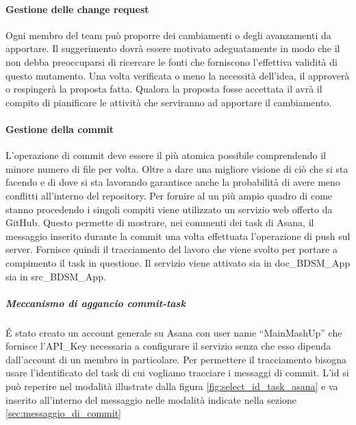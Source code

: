 			\paragraph{Gestione delle change request}
			Ogni membro del team può proporre dei cambiamenti o degli avanzamenti da apportare. Il suggerimento dovrà essere motivato adeguatamente in modo che il \roleProjectManager{} non debba preoccuparsi di ricercare le fonti che forniscono l'effettiva validità di questo mutamento. \newline
			Una volta verificata o meno la necessità dell'idea, il \roleProjectManager{} approverà o respingerà la proposta fatta. \newline
			Qualora la proposta fosse accettata il \roleProjectManager{} avrà il compito di pianificare le attività che serviranno ad apportare il cambiamento.
			
			\paragraph{Gestione della commit}
			L'operazione di commit deve essere il più atomica possibile comprendendo il minore numero di file per volta. Oltre a dare una migliore visione di ciò che si sta facendo e di dove si sta lavorando garantisce anche la probabilità di avere meno conflitti all'interno del repository. \newline
			Per fornire al \roleProjectManager{} un più ampio quadro di come stanno procedendo i singoli compiti viene utilizzato un servizio web offerto da GitHub. \newline
			Questo permette di mostrare, nei commenti dei task di Asana, il messaggio inserito durante la commit una volta effettuata l'operazione di push sul server. \newline
			Fornisce quindi il tracciamento del lavoro che viene svolto per portare a compimento il task in questione.
			Il servizio viene attivato sia in doc\_BDSM\_App sia in src\_BDSM\_App.
				\subparagraph{Meccanismo di aggancio commit-task} %
				\label{subp:meccanismo_di_aggancio_commit_task}
				\'E stato creato un account generale su Asana con user name ``MainMashUp'' che fornisce l'API\_Key necessaria a configurare il servizio senza che esso dipenda dall'account di un membro in particolare. \newline
				Per permettere il tracciamento bisogna usare l'identificato del task di cui vogliamo tracciare i messaggi di commit.\newline
				L'id si può reperire nel modalità illustrate dalla figura \ref{fig:select_id_task_asana} e va inserito all'interno del messaggio nelle modalità indicate nella sezione \ref{sec:messaggio_di_commit}
					
